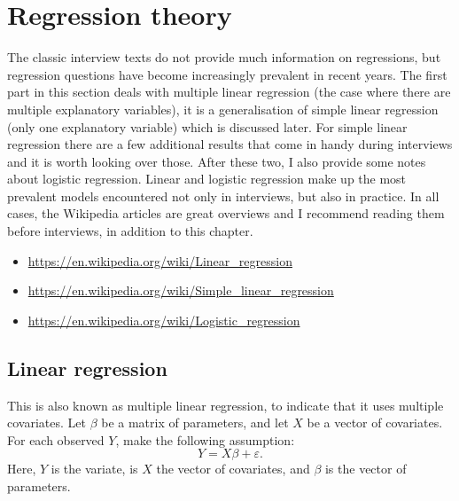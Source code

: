 \documentclass[a4paper]{article}
\begin{document}

\section{Regression theory}
\label{sec:regressiontheory}
The classic interview texts do not provide much information on regressions, but regression questions have become increasingly prevalent in recent years.
The first part in this section deals with multiple linear regression (the case where there are multiple explanatory variables), it is a generalisation of simple linear regression (only one explanatory variable) which is discussed later.
For simple linear regression there are a few additional results that come in handy during interviews and it is worth looking over those.
After these two, I also provide some notes about logistic regression.
Linear and logistic regression make up the most prevalent models encountered not only in interviews, but also in practice.
In all cases, the Wikipedia articles are great overviews and I recommend reading them before interviews, in addition to this chapter.\\
\begin{itemize}
  \item \url{https://en.wikipedia.org/wiki/Linear_regression}
  \item \url{https://en.wikipedia.org/wiki/Simple_linear_regression}
  \item \url{https://en.wikipedia.org/wiki/Logistic_regression}
\end{itemize}

\subsection{Linear regression}
This is also known as multiple linear regression, to indicate that it uses multiple covariates.
Let $\beta$ be a matrix of parameters, and let $X$ be a vector of covariates.
For each observed $Y$, make the following assumption:
\[
  Y = X \beta + \varepsilon
  \text{.}
\]
Here, $Y$ is the variate, is $X$ the vector of covariates, and $\beta$ is the vector of parameters.
\end{document}

